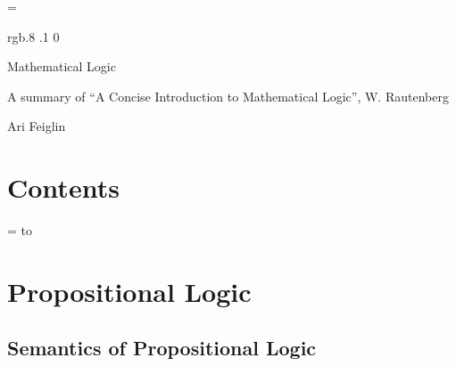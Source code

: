 %

\newcount\gentzencount
\def\gentzen#1#2{%
    \,\vcenter{%
        \tabskip=.15cm\relax%
        \gentzencount=1\relax%
        \offinterlineskip%
        \halign{\strut\hfil$\displaystyle{##}$\hfil&&\global\advance\gentzencount by 1\relax\vrule\kern.15cm$\displaystyle{##}$\cr%
            #1\cr\noalign{\hrule\kern1\jot}%
            \multispan{\the\gentzencount}\hfil$#2$\hfil\cr
        }%
    }\,%
}

\footline={}



\color rgb{.8 .1 0}

{\def\boxshadowcolor{rgb{.8 .8 0}}

    \centerline{Mathematical Logic}
    \smallskip
    \centerline{A summary of ``A Concise Introduction to Mathematical Logic'', W. Rautenberg}
    \centerline{Ari Feiglin}

\eppbox

\bigskip

\section*{Contents}

\tableofcontents
\eppbox

}

\vfill\break

\color{black}

\newif\ifpageodd
\pageoddtrue
\headline={%
    \hbox to \hsize{\color{black}%
        \ifpageodd\hfil{\it\currsubsection\quad\bf\folio}\global\pageoddfalse%
        \else{\bf\folio\quad\it\currsubsection}\hfil\global\pageoddtrue\fi%
    }%
}


\section{Propositional Logic}

\subsection{Semantics of Propositional Logic}

